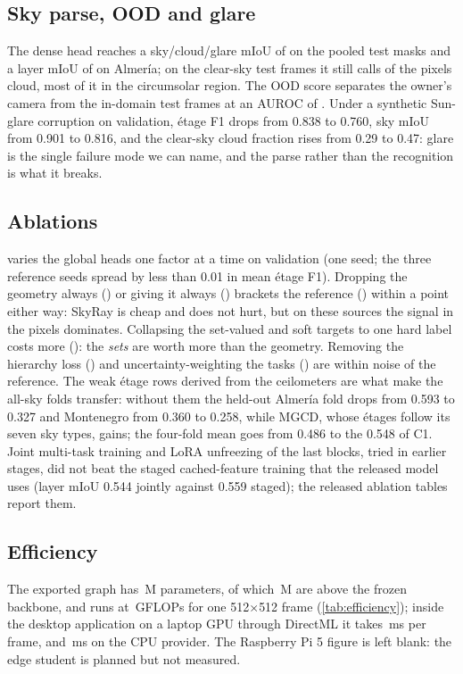 \subsection{Sky parse, OOD and glare}
The dense head reaches a sky/cloud/glare mIoU of \nSkyMiou{} on the pooled test masks and a layer mIoU of
\nLayerMiou{} on Almer\'ia; on the clear-sky test frames it still calls \nClearCloud{} of the pixels cloud, most of
it in the circumsolar region. The OOD score separates the owner's camera from the in-domain test frames at an
AUROC of \nOodAuroc{}. Under a synthetic Sun-glare corruption on validation, \'etage F1 drops from 0.838 to 0.760,
sky mIoU from 0.901 to 0.816, and the clear-sky cloud fraction rises from 0.29 to 0.47: glare is the single
failure mode we can name, and the parse rather than the recognition is what it breaks.

\subsection{Ablations}

 varies the global heads one factor at a time on validation (one seed; the three reference
seeds spread by less than 0.01 in mean \'etage F1). Dropping the geometry always (\nAblNoGeo) or giving it always
(\nAblGeoAlways) brackets the reference (\nAblRef) within a point either way: SkyRay is cheap and does not hurt, but
on these sources the signal in the pixels dominates. Collapsing the set-valued and soft targets to one hard label
costs more (\nAblHard): the \emph{sets} are worth more than the geometry. Removing the hierarchy loss (\nAblNoH) and
uncertainty-weighting the tasks (\nAblKendall) are within noise of the reference. The weak \'etage rows derived
from the ceilometers are what make the all-sky folds transfer: without them the held-out Almer\'ia fold drops from
0.593 to 0.327 and Montenegro from 0.360 to 0.258, while MGCD, whose \'etages follow its seven sky types, gains;
the four-fold mean goes from 0.486 to the 0.548 of C1. Joint multi-task training and LoRA unfreezing of the last
blocks, tried in earlier stages, did not beat the staged cached-feature training that the released model uses
(layer mIoU 0.544 jointly against 0.559 staged); the released ablation tables report them.

\subsection{Efficiency}

The exported graph has \nParamsM{}\,M parameters, of which \nHeadsParamsM{}\,M are above the frozen backbone, and
runs at \nGFlops{}\,GFLOPs for one 512$\times$512 frame (\cref{tab:efficiency}); inside the desktop application on a
laptop GPU through DirectML it takes \nLatencyDml{}\,ms per frame, and \nLatencyCpu{}\,ms on the CPU provider. The
Raspberry Pi 5 figure is left blank: the edge student is planned but not measured.

